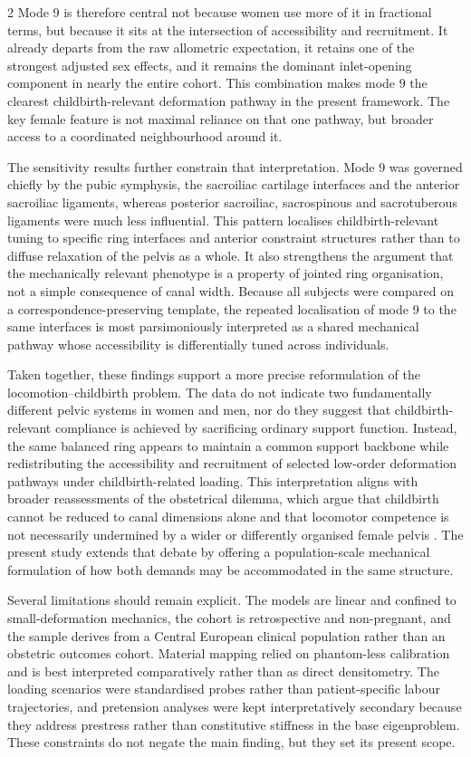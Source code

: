 \documentclass[openacc]{rsproca_new}
\begin{document}
\begin{multicols}{2}
Mode 9 is therefore central not because women use more of it in fractional terms, but because it sits at the intersection of accessibility and recruitment. It already departs from the raw allometric expectation, it retains one of the strongest adjusted sex effects, and it remains the dominant inlet-opening component in nearly the entire cohort. This combination makes mode 9 the clearest childbirth-relevant deformation pathway in the present framework. The key female feature is not maximal reliance on that one pathway, but broader access to a coordinated neighbourhood around it.

The sensitivity results further constrain that interpretation. Mode 9 was governed chiefly by the pubic symphysis, the sacroiliac cartilage interfaces and the anterior sacroiliac ligaments, whereas posterior sacroiliac, sacrospinous and sacrotuberous ligaments were much less influential. This pattern localises childbirth-relevant tuning to specific ring interfaces and anterior constraint structures rather than to diffuse relaxation of the pelvis as a whole. It also strengthens the argument that the mechanically relevant phenotype is a property of jointed ring organisation, not a simple consequence of canal width. Because all subjects were compared on a correspondence-preserving template, the repeated localisation of mode 9 to the same interfaces is most parsimoniously interpreted as a shared mechanical pathway whose accessibility is differentially tuned across individuals.

Taken together, these findings support a more precise reformulation of the locomotion--childbirth problem. The data do not indicate two fundamentally different pelvic systems in women and men, nor do they suggest that childbirth-relevant compliance is achieved by sacrificing ordinary support function. Instead, the same balanced ring appears to maintain a common support backbone while redistributing the accessibility and recruitment of selected low-order deformation pathways under childbirth-related loading. This interpretation aligns with broader reassessments of the obstetrical dilemma, which argue that childbirth cannot be reduced to canal dimensions alone and that locomotor competence is not necessarily undermined by a wider or differently organised female pelvis \cite{grunstra2023,warrener2015,pavlicev2020,betti2018}. The present study extends that debate by offering a population-scale mechanical formulation of how both demands may be accommodated in the same structure.

Several limitations should remain explicit. The models are linear and confined to small-deformation mechanics, the cohort is retrospective and non-pregnant, and the sample derives from a Central European clinical population rather than an obstetric outcomes cohort. Material mapping relied on phantom-less calibration and is best interpreted comparatively rather than as direct densitometry. The loading scenarios were standardised probes rather than patient-specific labour trajectories, and pretension analyses were kept interpretatively secondary because they address prestress rather than constitutive stiffness in the base eigenproblem. These constraints do not negate the main finding, but they set its present scope.


\end{multicols}
\end{document}
